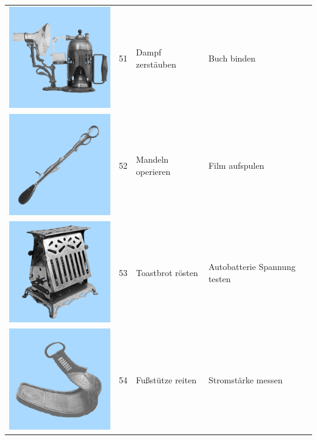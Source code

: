 \documentclass[
  english,
  man,floatsintext]{apa7}
\begin{document}
\begin{center}
\begin{ThreePartTable}
\begin{longtable}{llll}
\includegraphics[valign=c, scale=0.19]{../materials/unfamiliar/51.png} & 51 & Dampf zerstäuben & Buch binden\\
\includegraphics[valign=c, scale=0.19]{../materials/unfamiliar/52.png} & 52 & Mandeln operieren & Film aufspulen\\
\includegraphics[valign=c, scale=0.19]{../materials/unfamiliar/53.png} & 53 & Toastbrot rösten & Autobatterie Spannung testen\\
\includegraphics[valign=c, scale=0.19]{../materials/unfamiliar/54.png} & 54 & Fußstütze reiten & Stromstärke messen\\

\end{longtable}
\end{ThreePartTable}
\end{center}
\end{document}
